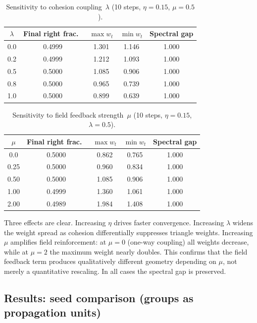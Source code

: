 \documentclass[11pt]{article}
\begin{document}
\begin{table}[ht]
\centering
\small
\caption{Sensitivity to cohesion coupling~$\lambda$ (10 steps, $\eta=0.15$, $\mu=0.5$).}
\label{tab:lambda}
\begin{tabular}{ccccc}
\toprule
$\lambda$ & Final right frac.\ & $\max w_t$ & $\min w_t$ & Spectral gap \\
\midrule
0.0 & 0.4999 & 1.301 & 1.146 & 1.000 \\
0.2 & 0.4999 & 1.212 & 1.093 & 1.000 \\
0.5 & 0.5000 & 1.085 & 0.906 & 1.000 \\
0.8 & 0.5000 & 0.965 & 0.739 & 1.000 \\
1.0 & 0.5000 & 0.899 & 0.639 & 1.000 \\
\bottomrule
\end{tabular}
\end{table}

\begin{table}[ht]
\centering
\small
\caption{Sensitivity to field feedback strength~$\mu$ (10 steps, $\eta=0.15$, $\lambda=0.5$).}
\label{tab:mu}
\begin{tabular}{ccccc}
\toprule
$\mu$ & Final right frac.\ & $\max w_t$ & $\min w_t$ & Spectral gap \\
\midrule
0.0 & 0.5000 & 0.862 & 0.765 & 1.000 \\
0.25 & 0.5000 & 0.960 & 0.834 & 1.000 \\
0.50 & 0.5000 & 1.085 & 0.906 & 1.000 \\
1.00 & 0.4999 & 1.360 & 1.061 & 1.000 \\
2.00 & 0.4989 & 1.984 & 1.408 & 1.000 \\
\bottomrule
\end{tabular}
\end{table}

Three effects are clear.  Increasing $\eta$ drives faster convergence.  Increasing $\lambda$ widens the weight spread as cohesion differentially suppresses triangle weights.  Increasing $\mu$ amplifies field reinforcement: at $\mu=0$ (one-way coupling) all weights decrease, while at $\mu=2$ the maximum weight nearly doubles.  This confirms that the field feedback term produces qualitatively different geometry depending on $\mu$, not merely a quantitative rescaling.  In all cases the spectral gap is preserved.

\subsection{Results: seed comparison (groups as propagation units)}
\end{document}
